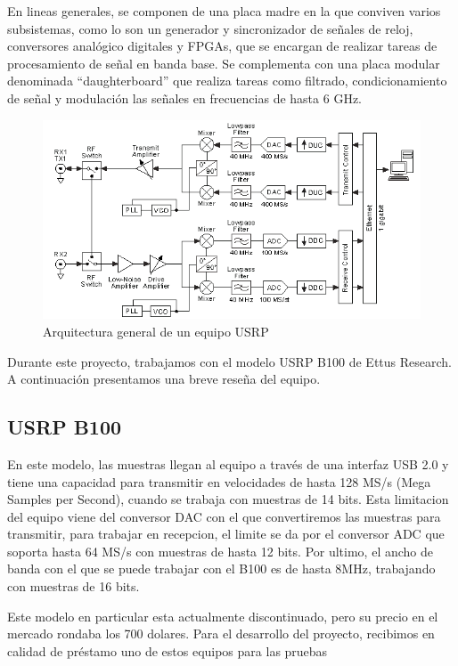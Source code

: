 En lineas generales, se componen de una placa madre en la que conviven varios subsistemas, como lo son un generador y sincronizador de señales de reloj, conversores analógico digitales y FPGAs, que se encargan de realizar tareas de procesamiento de señal en banda base. Se complementa con una placa modular denominada “daughterboard” que realiza tareas como filtrado, condicionamiento de señal y modulación las señales en frecuencias de hasta 6 GHz.

\begin{figure}[h!]
	\centering
	\includegraphics[scale=0.55]{figuras/cap04/usrp_arq}
	\caption{\label{f:usrp_arq} Arquitectura general de un equipo USRP\cite{USRP_arch}}
\end{figure}

Durante este proyecto, trabajamos con el modelo USRP B100 de Ettus Research. A continuación presentamos una breve reseña del equipo.

\subsection{USRP B100}

En este modelo, las muestras llegan al equipo a través de una interfaz USB 2.0 y tiene una capacidad para transmitir en velocidades de hasta 128 MS/s (Mega Samples per Second), cuando se trabaja con muestras de 14 bits. Esta limitacion del equipo viene del conversor DAC con el que convertiremos las muestras para transmitir, para trabajar en recepcion, el limite se da por el conversor ADC que soporta hasta 64 MS/s con muestras de hasta 12 bits. Por ultimo, el ancho de banda con el que se puede trabajar con el B100 es de hasta 8MHz, trabajando con muestras de 16 bits.\cite{b100}  

Este modelo en particular esta actualmente discontinuado, pero su precio en el mercado rondaba los 700 dolares. Para el desarrollo del proyecto, recibimos en calidad de préstamo uno de estos equipos para las pruebas

